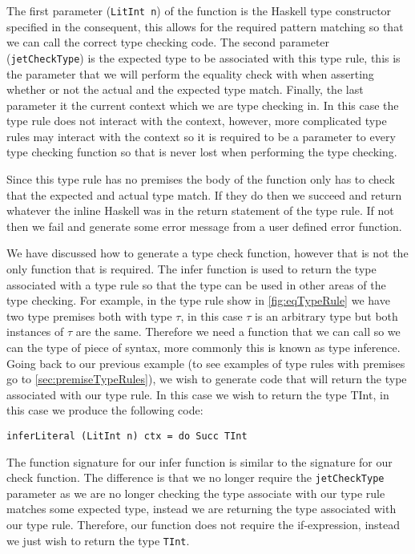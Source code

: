 The first parameter (\texttt{LitInt n}) of the function is the Haskell type constructor specified in the consequent, this allows for the required pattern matching so that we can call the correct type checking code.
The second parameter (\texttt{jetCheckType}) is the expected type to be associated with this type rule, this is the parameter that we will perform the equality check with when asserting whether or not the actual and the expected type match.
Finally, the last parameter it the current context which we are type checking in.
In this case the type rule does not interact with the context, however, more complicated type rules may interact with the context so it is required to be a parameter to every type checking function so that is never lost when performing the type checking.

Since this type rule has no premises the body of the function only has to check that the expected and actual type match.
If they do then we succeed and return whatever the inline Haskell was in the return statement of the type rule.
If not then we fail and generate some error message from a user defined error function.

We have discussed how to generate a type check function, however that is not the only function that is required. 
The infer function is used to return the type associated with a type rule so that the type can be used in other areas of the type checking.
For example, in the type rule show in \autoref{fig:eqTypeRule} we have two type premises both with type $\tau$, in this case $\tau$ is an arbitrary type but both instances of $\tau$ are the same.
Therefore we need a function that we can call so we can the type of piece of syntax, more commonly this is known as type inference\cite{cardelli1996type}.
Going back to our previous example (to see examples of type rules with premises go to \autoref{sec:premiseTypeRules}), we wish to generate code that will return the type associated with our type rule.
In this case we wish to return the type TInt, in this case we produce the following code:
\begin{lstlisting}[numbers=none]
inferLiteral (LitInt n) ctx = do Succ TInt
\end{lstlisting}
The function signature for our infer function is similar to the signature for our check function.
The difference is that we no longer require the \texttt{jetCheckType} parameter as we are no longer checking the type associate with our type rule matches some expected type, instead we are returning the type associated with our type rule.
Therefore, our function does not require the if-expression, instead we just wish to return the type \texttt{TInt}.

